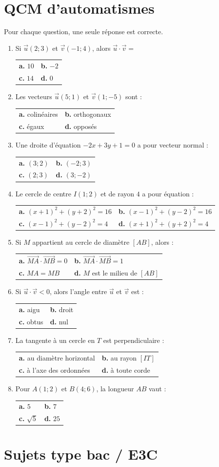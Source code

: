 \documentclass[11pt,a4paper]{article}
\makeatletter
\newcommand{\vect}[1]{\overrightarrow{#1}}
\newcounter{question}
\newcommand{\qcm}[4]{%
\begin{center}\begin{tabularx}{0.96\linewidth}{@{}XX@{}}
\textbf{a.} #1 & \textbf{b.} #2\\[1mm]
\textbf{c.} #3 & \textbf{d.} #4
\end{tabularx}\end{center}}
\makeatother
\begin{document}
\section{QCM d’automatismes}
Pour chaque question, une seule réponse est correcte.
\begin{enumerate}
\item Si $\vec u(2;3)$ et $\vec v(-1;4)$, alors $\vec u\cdot\vec v=$
\qcm{$10$}{$-2$}{$14$}{$0$}
\item Les vecteurs $\vec u(5;1)$ et $\vec v(1;-5)$ sont :
\qcm{colinéaires}{orthogonaux}{égaux}{opposés}
\item Une droite d’équation $-2x+3y+1=0$ a pour vecteur normal :
\qcm{$(3;2)$}{$(-2;3)$}{$(2;3)$}{$(3;-2)$}
\item Le cercle de centre $I(1;2)$ et de rayon $4$ a pour équation :
\qcm{$(x+1)^2+(y+2)^2=16$}{$(x-1)^2+(y-2)^2=16$}{$(x-1)^2+(y-2)^2=4$}{$(x+1)^2+(y+2)^2=4$}
\item Si $M$ appartient au cercle de diamètre $[AB]$, alors :
\qcm{$\vect{MA}\cdot\vect{MB}=0$}{$\vect{MA}\cdot\vect{MB}=1$}{$MA=MB$}{$M$ est le milieu de $[AB]$}
\item Si $\vec u\cdot\vec v<0$, alors l’angle entre $\vec u$ et $\vec v$ est :
\qcm{aigu}{droit}{obtus}{nul}
\item La tangente à un cercle en $T$ est perpendiculaire :
\qcm{au diamètre horizontal}{au rayon $[IT]$}{à l’axe des ordonnées}{à toute corde}
\item Pour $A(1;2)$ et $B(4;6)$, la longueur $AB$ vaut :
\qcm{$5$}{$7$}{$\sqrt{5}$}{$25$}
\end{enumerate}

\section{Sujets type bac / E3C}
\end{document}
